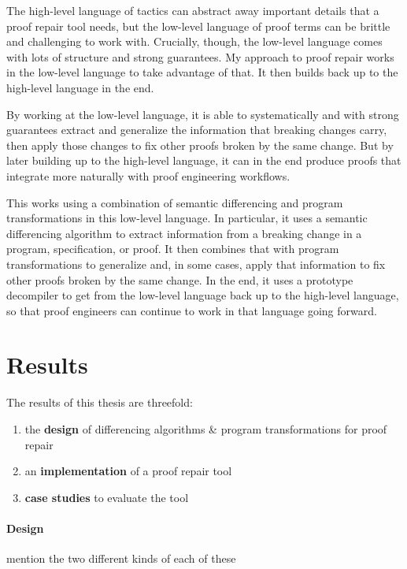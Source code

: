 The high-level language of tactics can abstract away important details that a proof repair tool needs,
but the low-level language of proof terms can be brittle and challenging to work with.
Crucially, though, the low-level language comes with lots of structure and strong guarantees.
My approach to proof repair works in the low-level language to take advantage of that.
It then builds back up to the high-level language in the end.

By working at the low-level language, it is able to systematically and with strong guarantees extract and generalize the 
information that breaking changes carry,
then apply those changes to fix other proofs broken by the same change.
But by later building up to the high-level language,
it can in the end produce proofs that integrate more naturally with proof engineering workflows.

This works using a combination of semantic differencing and program transformations in this low-level language.
In particular, it uses a semantic differencing algorithm to extract information from a breaking change in a program, specification, or proof.
It then combines that with program transformations to generalize and, in some cases, apply that information to fix other 
proofs broken by the same change.
In the end, it uses a prototype decompiler to get from the low-level language back up to the high-level language,
so that proof engineers can continue to work in that language going forward. %

\section{Results}

The results of this thesis are threefold:

\begin{enumerate}
\item the \textbf{design} of differencing algorithms \& program transformations for proof repair
\item an \textbf{implementation} of a proof repair tool 
\item \textbf{case studies} to evaluate the tool
\end{enumerate}

\paragraph{Design}
mention the two different kinds of each of these

